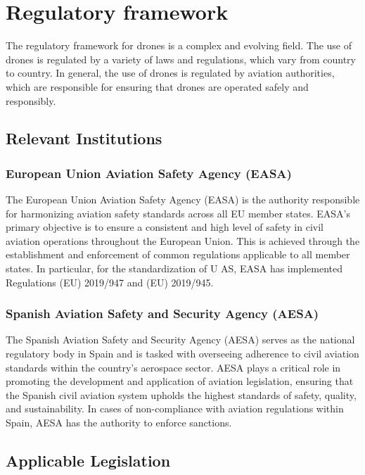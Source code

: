 \chapter{Regulatory framework}

The regulatory framework for drones is a complex and evolving field. The use of drones is regulated by a variety of laws and regulations, which vary from country to country. In general, the use of drones is regulated by aviation authorities, which are responsible for ensuring that drones are operated safely and responsibly.

\section{Relevant Institutions}

\subsection{European Union Aviation Safety Agency (EASA)}

The European Union Aviation Safety Agency (EASA) is the authority responsible for harmonizing aviation safety standards across all EU member states. EASA’s primary objective is to ensure a consistent and high level of safety in civil aviation operations throughout the European Union. This is achieved through the establishment and enforcement of common regulations applicable to all member states. In particular, for the standardization of U AS, EASA has implemented Regulations (EU) 2019/947 and (EU) 2019/945.

\subsection{Spanish Aviation Safety and Security Agency (AESA)}

The Spanish Aviation Safety and Security Agency (AESA) serves as the national regulatory body in Spain and is tasked with overseeing adherence to civil aviation standards within the country’s aerospace sector. AESA plays a critical role in promoting the development and application of aviation legislation, ensuring that the Spanish civil aviation system upholds the highest standards of safety, quality, and sustainability. In cases of non-compliance with aviation regulations within Spain, AESA has the authority to enforce sanctions.

\section{Applicable Legislation}

